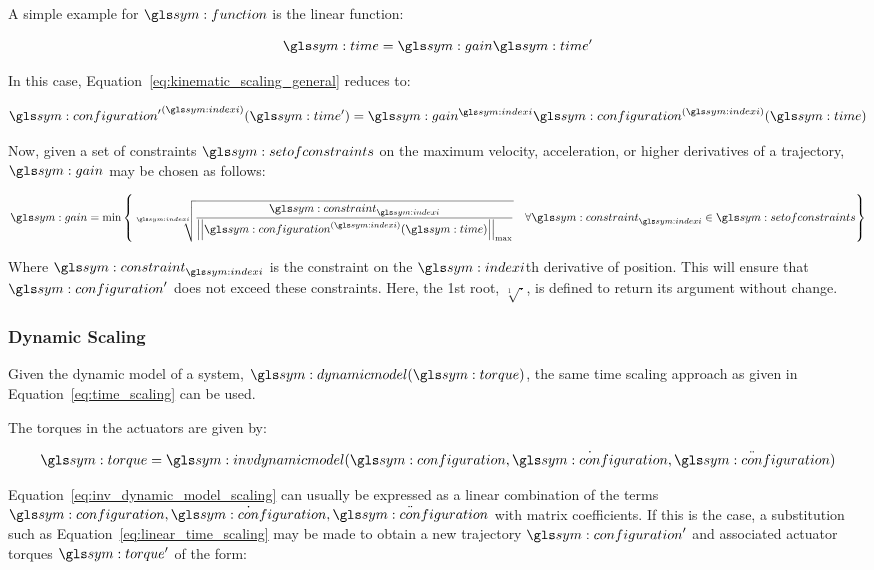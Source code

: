 			A simple example for $\function$ is the linear function:

			\begin{equation}
				\timesym = \gain\timesym'
				\label{eq:linear_time_scaling}
			\end{equation}

			In this case, Equation~\ref{eq:kinematic_scaling_general} reduces
			to:

			\begin{equation}
				\tdern{\configuration'}{\indexi}(\timesym') = \gain^{\indexi}
					\tdern{\configuration}{\indexi}(\timesym)
			\end{equation}

			Now, given a set of constraints $\setofconstraints$ on the maximum
			velocity, acceleration, or higher derivatives of a trajectory,
			$\gain$ may be chosen as follows:

			\begin{equation}
				\gain = \min
					\left\{
						\sqrt[\indexi]
						{%
							\frac
							{%
								\constraint_{\indexi}
							}
							{%
									\norm
									{%
										\tdern{\configuration}{\indexi}(\timesym)
									}_{\max}
							}
						}
						\quad
						\forall \constraint_{\indexi} \in \setofconstraints
					\right\}
			\end{equation}

			Where $\constraint_{\indexi}$ is the constraint on the $\indexi$th
			derivative of position. This will ensure that $\configuration'$ does
			not exceed these constraints. Here, the 1st root, $\sqrt[1]{\cdot}$,
			is defined to return its argument without change.

		\subsubsection{Dynamic Scaling}%
		\label{sec:dynamic_scaling}

			Given the dynamic model of a system, $\dynamicmodel(\torque)$, the
			same time scaling approach as given in
			Equation~\ref{eq:time_scaling} can be used.

			The torques in the actuators are given by:

			\begin{equation}
				\torque = \invdynamicmodel(\configuration, \dot{\configuration},
					\ddot{\configuration})
				\label{eq:inv_dynamic_model_scaling}
			\end{equation}

			Equation~\ref{eq:inv_dynamic_model_scaling} can usually be expressed
			as a linear combination of the terms $\configuration,
			\dot{\configuration}, \ddot{\configuration}$ with matrix
			coefficients. If this is the case, a substitution such as
			Equation~\ref{eq:linear_time_scaling} may be made to obtain a new
			trajectory $\configuration'$ and associated actuator torques
			$\torque'$ of the form:

